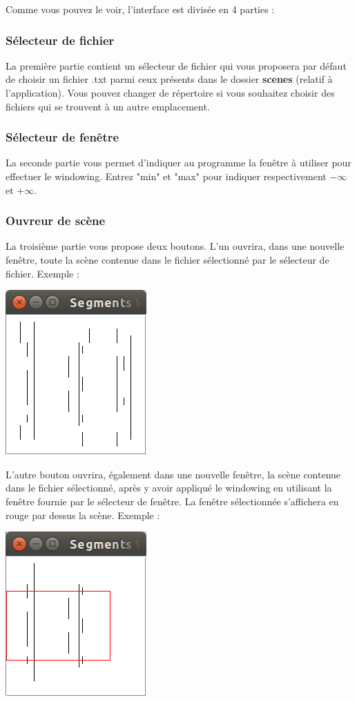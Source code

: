 \documentclass[10pt,a4paper]{article}
\begin{document}
Comme vous pouvez le voir, l'interface est divisée en 4 parties :
\subsubsection{Sélecteur de fichier}
La première partie contient un sélecteur de fichier qui vous proposera par défaut de choisir un fichier .txt parmi ceux présents dans le dossier \textbf{scenes} (relatif à l'application). Vous pouvez changer de répertoire si vous souhaitez choisir des fichiers qui se trouvent à un autre emplacement.

\subsubsection{Sélecteur de fenêtre}
La seconde partie vous permet d'indiquer au programme la fenêtre à utiliser pour effectuer le windowing. Entrez "min" et "max" pour indiquer respectivement $-\infty$ et $+\infty$.

\subsubsection{Ouvreur de scène}
La troisième partie vous propose deux boutons. L'un ouvrira, dans une nouvelle fenêtre, toute la scène contenue dans le fichier sélectionné par le sélecteur de fichier. Exemple :

\centerline{\includegraphics[scale=0.5]{images/ui_whole_scene.png}}

L'autre bouton ouvrira, également dans une nouvelle fenêtre, la scène contenue dans le fichier sélectionné, après y avoir appliqué le windowing en utilisant la fenêtre fournie par le sélecteur de fenêtre. La fenêtre sélectionnée s'affichera en rouge par dessus la scène. Exemple :

\centerline{\includegraphics[scale=0.5]{images/ui_restricted_window.png}}
\end{document}
